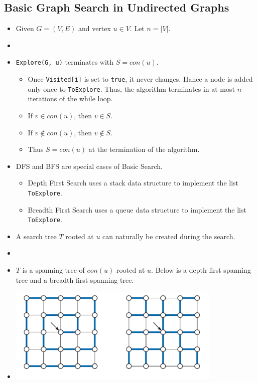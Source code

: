 \subsection{Basic Graph Search in Undirected Graphs}
\begin{itemize}
    \item Given $G = (V, E)$ and vertex $u \in V$. Let $n = \left|V\right|$.
    \item[] 
    \item \texttt{Explore(G, u)} terminates with $S = con(u)$.
    \begin{itemize}
        \item Once \texttt{Visited[i]} is set to \texttt{true}, it never changes. Hance a node is added only once to \texttt{ToExplore}. Thus, the algorithm terminates in at most $n$ iterations of the while loop.
        \item If $v \in con(u)$, then $v \in S$.
        \item If $v \notin con(u)$, then $v \notin S$.
        \item Thus $S = con(u)$ at the termination of the algorithm.
    \end{itemize}
    \item DFS and BFS are special cases of Basic Search.
    \begin{itemize}
        \item Depth First Search uses a stack data structure to implement the list \texttt{ToExplore}.
        \item Breadth First Search uses a queue data structure to implement the list \texttt{ToExplore}.
    \end{itemize}
    \item A search tree $T$ rooted at $u$ can naturally be created during the search.
    \item[] 
    \item $T$ is a spanning tree of $con(u)$ rooted at $u$. Below is a depth first spanning tree and a breadth first spanning tree.
    \item[] \includegraphics[width=0.8\textwidth]{lecture15/images/spanning-tree.jpg}
\end{itemize}
